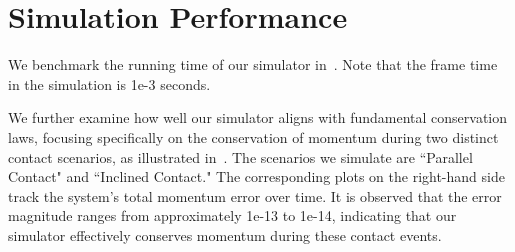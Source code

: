 \begin{table}[h]
    \centering
    \caption{\textbf{Success rates for VLA fine-tuning.} RL baselines are per-task single-task policies. SmolVLA is evaluated as a single policy trained jointly on all four tasks. Each method is evaluated on 15 trajectories per task.}
    \label{tab:vla_results}
\end{table}

\section{Simulation Performance}
We benchmark the running time of our simulator in~. Note that the frame time in the simulation is 1e-3 seconds.

We further examine how well our simulator aligns with fundamental conservation laws, focusing specifically on the conservation of momentum during two distinct contact scenarios, as illustrated in~. The scenarios we simulate are ``Parallel Contact" and ``Inclined Contact." The corresponding plots on the right-hand side track the system's total momentum error over time. It is observed that the error magnitude ranges from approximately 1e-13 to 1e-14, indicating that our simulator effectively conserves momentum during these contact events.


